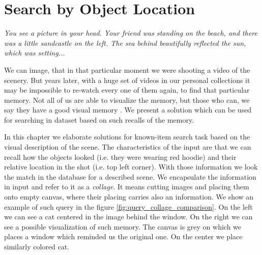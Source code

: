 

\chapter{Search by Object Location}
\label{ch:object_location}

\emph{You see a picture in your head. Your friend was standing on the beach, and there was a little sandcastle on the left. The sea behind beautifully reflected the sun, which was setting...}

We can image, that in that particular moment we were shooting a video of the scenery. But years later, with a huge set of videos in our personal collections it may be impossible to re-watch every one of them again, to find that particular memory. Not all of us are able to visualize the memory, but those who can, we say they have a good visual memory . We present a solution which can be used for searching in dataset based on such recalls of the memory.

In this chapter we elaborate solutions for known-item search task based on the visual description of the scene. The characteristics of the input are that we can recall how the objects looked (i.e. they were wearing red hoodie) and their relative location in the shot (i.e. top left corner). With those information we look the match in the database for a described scene. We encapsulate the information in input and refer to it as a \emph{collage}. It means cutting images and placing them onto empty canvas, where their placing carries also an information. We show an example of such query in the figure \ref{fig:query_collage_comparison}. On the left we can see a cat centered in the image behind the window. On the right we can see a possible visualization of such memory. The canvas is grey on which we places a window which reminded us the original one. On the center we place similarly colored cat.

